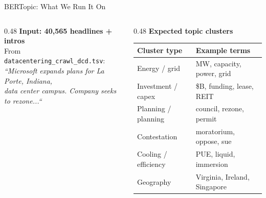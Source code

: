 \documentclass[aspectratio=169,11pt]{beamer}
\newcommand{\iconfull}[2]{\textcolor{#1}{\faIcon{#2}}}
\begin{document}
\begin{frame}[shrink=3]{\iconfull{dcblue}{project-diagram}\enspace BERTopic: What We Run It On}
\begin{columns}[T]
\begin{column}{0.48\textwidth}
  \small\textbf{Input: 40,565 headlines + intros}\\[0.3em]
  \footnotesize
  From \texttt{datacentering\_crawl\_dcd.tsv}:\\
  \textit{``Microsoft expands plans for La Porte, Indiana,}\\
  \textit{data center campus. Company seeks to rezone...``}\\[0.4em]

\end{column}
\begin{column}{0.48\textwidth}
  \small\textbf{Expected topic clusters}\\[0.3em]
  \footnotesize
  \begin{tabular}{@{}ll@{}}
    \toprule
    \textbf{Cluster type} & \textbf{Example terms} \\
    \midrule
    Energy / grid       & MW, capacity, power, grid \\
    Investment / capex  & \$B, funding, lease, REIT \\
    Planning / planning & council, rezone, permit \\
    Contestation        & moratorium, oppose, sue \\
    Cooling / efficiency & PUE, liquid, immersion \\
    Geography           & Virginia, Ireland, Singapore \\

\end{tabular}
\end{column}
\end{columns}
\end{frame}
\end{document}
